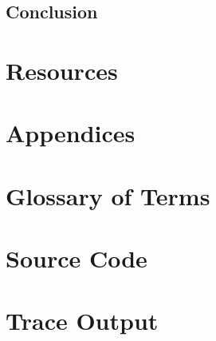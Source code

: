 \section{Conclusion}



\chapter{Resources}
\nocite{*}



\chapter{Appendices}
\appendix

\chapter{Glossary of Terms}\label{sec:glosterm}
\printglossaries

\newpage
\chapter{Source Code}\label{sec:srccode}

\newpage
\chapter{Trace Output}\label{sec:traceout}



